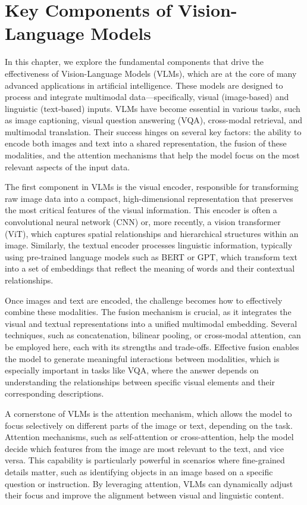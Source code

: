 \chapter{Key Components of Vision-Language Models}




In this chapter, we explore the fundamental components that drive the effectiveness of Vision-Language Models (VLMs), which are at the core of many advanced applications in artificial intelligence. These models are designed to process and integrate multimodal data—specifically, visual (image-based) and linguistic (text-based) inputs. VLMs have become essential in various tasks, such as image captioning, visual question answering (VQA), cross-modal retrieval, and multimodal translation. Their success hinges on several key factors: the ability to encode both images and text into a shared representation, the fusion of these modalities, and the attention mechanisms that help the model focus on the most relevant aspects of the input data.

The first component in VLMs is the visual encoder, responsible for transforming raw image data into a compact, high-dimensional representation that preserves the most critical features of the visual information. This encoder is often a convolutional neural network (CNN) or, more recently, a vision transformer (ViT), which captures spatial relationships and hierarchical structures within an image. Similarly, the textual encoder processes linguistic information, typically using pre-trained language models such as BERT or GPT, which transform text into a set of embeddings that reflect the meaning of words and their contextual relationships.

Once images and text are encoded, the challenge becomes how to effectively combine these modalities. The fusion mechanism is crucial, as it integrates the visual and textual representations into a unified multimodal embedding. Several techniques, such as concatenation, bilinear pooling, or cross-modal attention, can be employed here, each with its strengths and trade-offs. Effective fusion enables the model to generate meaningful interactions between modalities, which is especially important in tasks like VQA, where the answer depends on understanding the relationships between specific visual elements and their corresponding descriptions.

A cornerstone of VLMs is the attention mechanism, which allows the model to focus selectively on different parts of the image or text, depending on the task. Attention mechanisms, such as self-attention or cross-attention, help the model decide which features from the image are most relevant to the text, and vice versa. This capability is particularly powerful in scenarios where fine-grained details matter, such as identifying objects in an image based on a specific question or instruction. By leveraging attention, VLMs can dynamically adjust their focus and improve the alignment between visual and linguistic content.

